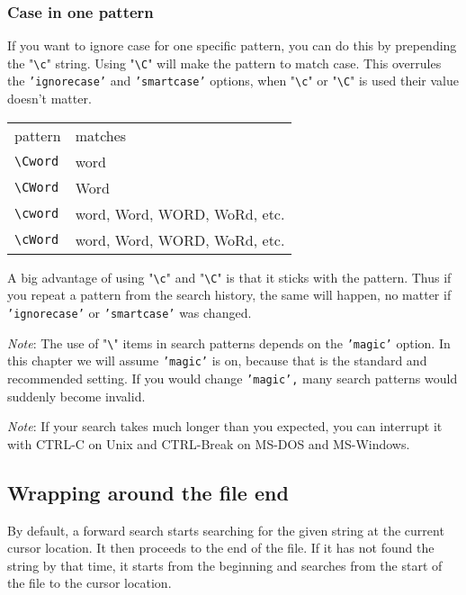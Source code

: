 \subsubsection{Case in one pattern}
If you want to ignore case for one specific pattern, you can do this by prepending the "\texttt{\textbackslash{}c}" string.
Using "\texttt{\textbackslash{}C}" will make the pattern to match case.
This overrules the \texttt{'ignorecase'} and \texttt{'smartcase'} options, when "\texttt{\textbackslash{}c}" or "\texttt{\textbackslash{}C}" is used their value doesn't matter.

\begin{center} \begin{tabular}{l l}
				pattern & matches \\
				\texttt{\textbackslash{}Cword} & word\\
				\texttt{\textbackslash{}CWord} & Word\\
				\texttt{\textbackslash{}cword} & word, Word, WORD, WoRd, etc.\\
				\texttt{\textbackslash{}cWord} & word, Word, WORD, WoRd, etc.\\
\end{tabular} \end{center}

A big advantage of using "\texttt{\textbackslash{}c}" and "\texttt{\textbackslash{}C}" is that it sticks with the pattern.
Thus if you repeat a pattern from the search history, the same will happen, no matter if \texttt{'ignorecase'} or \texttt{'smartcase'} was changed.

\emph{Note}: The use of "\texttt{\textbackslash{}}" items in search patterns depends on the \texttt{'magic'} option.
In this chapter we will assume \texttt{'magic'} is on, because that is the standard and recommended setting.
If you would change \texttt{'magic',} many search patterns would suddenly become invalid.

\emph{Note}: If your search takes much longer than you expected, you can interrupt it with CTRL-C on Unix and  CTRL-Break on MS-DOS and MS-Windows.
\subsection{Wrapping around the file end}
By default, a forward search starts searching for the given string at the current cursor location.
It then proceeds to the end of the file.
If it has not found the string by that time, it starts from the beginning and searches from the start of the file to the cursor location.

